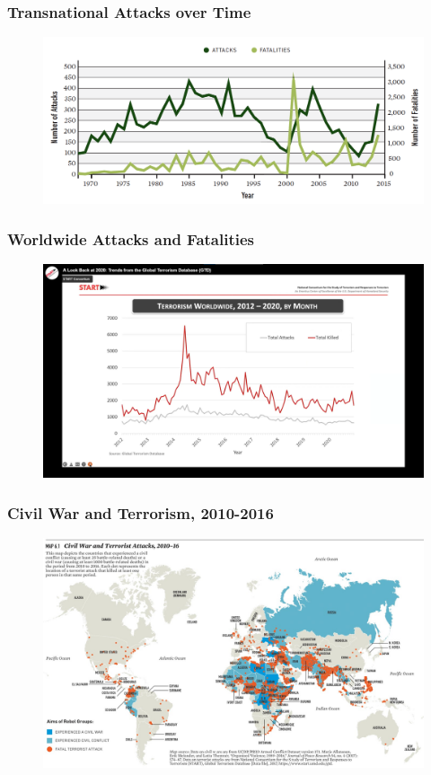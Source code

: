 \documentclass{beamer}
\begin{document}
\begin{frame} 
\frametitle{\LARGE{Transnational Attacks over Time}}
\begin{figure}[ht!]
	\centering
	\includegraphics[width=\textwidth,height=0.8\textheight,keepaspectratio]{./trans_attacks.png}
\end{figure}
\end{frame}

\begin{frame} 
	\frametitle{\LARGE{Worldwide Attacks and Fatalities}}
	\begin{figure}[ht!]
		\centering
		\includegraphics[width=\textwidth,height=\textheight,keepaspectratio]{terrorism2012.png}
	\end{figure}
\end{frame}

\begin{frame} 
	\frametitle{\LARGE{Civil War and Terrorism, 2010-2016}}
	\begin{figure}[ht!]
		\centering
		\includegraphics[width=\textwidth,height=0.8\textheight,keepaspectratio]{civwarter.jpg}
	\end{figure}
\end{frame}
\end{document}

